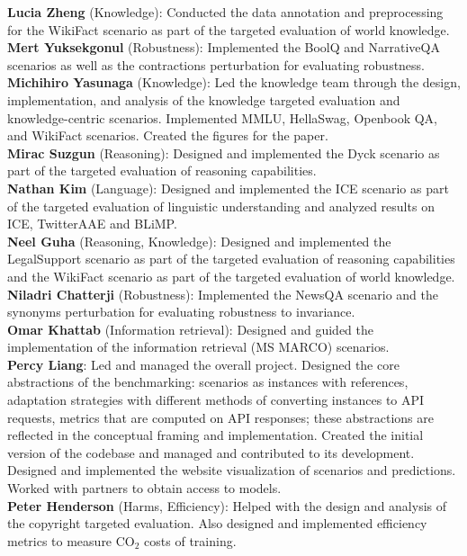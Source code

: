 \textbf{Lucia Zheng} (Knowledge): Conducted the data annotation and preprocessing for the WikiFact scenario as part of the targeted evaluation of world knowledge. \\
\textbf{Mert Yuksekgonul} (Robustness): Implemented the BoolQ and NarrativeQA scenarios as well as the contractions perturbation for evaluating robustness. \\ 
\textbf{Michihiro Yasunaga} (Knowledge): Led the knowledge team through the design, implementation, and analysis of the knowledge targeted evaluation and knowledge-centric \core scenarios. Implemented MMLU, HellaSwag, Openbook QA, and WikiFact scenarios. 
Created the figures for the paper. \\ 
\textbf{Mirac Suzgun} (Reasoning): Designed and implemented the Dyck scenario as part of the targeted evaluation of reasoning capabilities. \\ 
\textbf{Nathan Kim} (Language): Designed and implemented the ICE scenario as part of the targeted evaluation of linguistic understanding and analyzed results on ICE, TwitterAAE and BLiMP. \\ 
\textbf{Neel Guha} (Reasoning, Knowledge): Designed and implemented the LegalSupport scenario as part of the targeted evaluation of reasoning capabilities and the WikiFact scenario as part of the targeted evaluation of world knowledge. \\ 
\textbf{Niladri Chatterji} (Robustness): Implemented the NewsQA scenario and the synonyms perturbation for evaluating robustness to invariance.\\ 
\textbf{Omar Khattab} (Information retrieval): Designed and guided the implementation of the information retrieval (MS MARCO) scenarios. \\ 
\textbf{Percy Liang}: Led and managed the overall project. Designed the core abstractions of the benchmarking: scenarios as instances with references, adaptation strategies with different methods of converting instances to API requests, metrics that are computed on API responses; these abstractions are reflected in the conceptual framing and implementation.  Created the initial version of the codebase and managed and contributed to its development.  Designed and implemented the website visualization of scenarios and predictions.  Worked with partners to obtain access to models. \\ 
\textbf{Peter Henderson} (Harms, Efficiency): Helped with the design and analysis of the copyright targeted evaluation. Also designed and implemented efficiency metrics to measure CO$_\text{2}$ costs of training.\\ 
